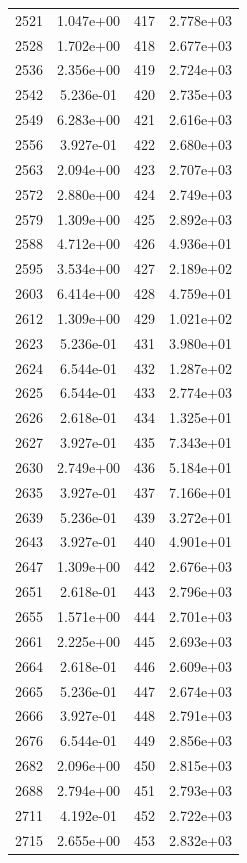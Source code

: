 \documentclass[12pt]{article}
\begin{document}
\begin{longtable}{@{}cccc@{}}
2521 & 1.047e+00 & 417 & 2.778e+03 \\
2528 & 1.702e+00 & 418 & 2.677e+03 \\
2536 & 2.356e+00 & 419 & 2.724e+03 \\
2542 & 5.236e-01 & 420 & 2.735e+03 \\
2549 & 6.283e+00 & 421 & 2.616e+03 \\
2556 & 3.927e-01 & 422 & 2.680e+03 \\
2563 & 2.094e+00 & 423 & 2.707e+03 \\
2572 & 2.880e+00 & 424 & 2.749e+03 \\
2579 & 1.309e+00 & 425 & 2.892e+03 \\
2588 & 4.712e+00 & 426 & 4.936e+01 \\
2595 & 3.534e+00 & 427 & 2.189e+02 \\
2603 & 6.414e+00 & 428 & 4.759e+01 \\
2612 & 1.309e+00 & 429 & 1.021e+02 \\
2623 & 5.236e-01 & 431 & 3.980e+01 \\
2624 & 6.544e-01 & 432 & 1.287e+02 \\
2625 & 6.544e-01 & 433 & 2.774e+03 \\
2626 & 2.618e-01 & 434 & 1.325e+01 \\
2627 & 3.927e-01 & 435 & 7.343e+01 \\
2630 & 2.749e+00 & 436 & 5.184e+01 \\
2635 & 3.927e-01 & 437 & 7.166e+01 \\
2639 & 5.236e-01 & 439 & 3.272e+01 \\
2643 & 3.927e-01 & 440 & 4.901e+01 \\
2647 & 1.309e+00 & 442 & 2.676e+03 \\
2651 & 2.618e-01 & 443 & 2.796e+03 \\
2655 & 1.571e+00 & 444 & 2.701e+03 \\
2661 & 2.225e+00 & 445 & 2.693e+03 \\
2664 & 2.618e-01 & 446 & 2.609e+03 \\
2665 & 5.236e-01 & 447 & 2.674e+03 \\
2666 & 3.927e-01 & 448 & 2.791e+03 \\
2676 & 6.544e-01 & 449 & 2.856e+03 \\
2682 & 2.096e+00 & 450 & 2.815e+03 \\
2688 & 2.794e+00 & 451 & 2.793e+03 \\
2711 & 4.192e-01 & 452 & 2.722e+03 \\
2715 & 2.655e+00 & 453 & 2.832e+03 \\

\end{longtable}
\end{document}
